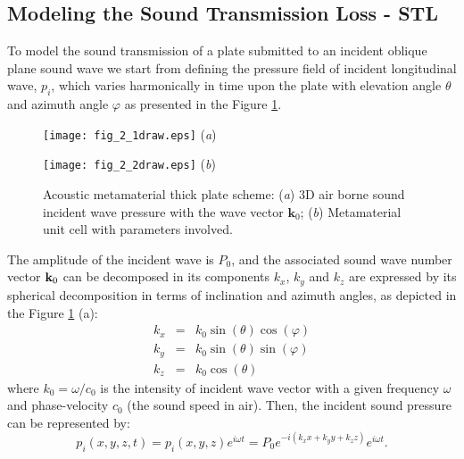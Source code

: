 \documentclass[a4paper]{ICEDyn}
\begin{document}
	\subsection{Modeling the Sound Transmission Loss - STL}

To model the sound transmission of a plate submitted to an incident oblique plane sound wave we start from defining the pressure field of incident longitudinal wave, $p_{i}$, which varies harmonically in time upon the plate with elevation angle $\theta$ and azimuth angle $\varphi$ as presented in the Figure \ref{incid}.
	\begin{figure}
		\begin{minipage} {.50\linewidth}
		\centering 
		\texttt{[image: fig\_2\_1draw.eps]}
		{(\textit{a})}%
		\end{minipage}\hfill
	\begin{minipage}{.50\linewidth}
		\centering
		\texttt{[image: fig\_2\_2draw.eps]}
		{(\textit{b})} %
	\end{minipage}\hfill
		\caption{Acoustic metamaterial thick plate scheme: (\textit{a}) 3D air borne sound incident wave pressure with the wave vector $ \mathbf{k}_{0} $; (\textit{b}) Metamaterial unit cell with parameters involved.}
		\label{incid}
	\end{figure}
	The amplitude of the incident wave is $P_0$, and the associated sound wave number vector ${\bf k}_0$ can be decomposed in its  components $k_{x}$, $k_{y}$ and $k_{z}$ are expressed by its spherical decomposition in terms of inclination and azimuth angles, as depicted in the Figure \ref{incid} (a):    
	\begin{eqnarray}
	k_{x} &=& k_{0}\sin(\theta)\cos(\varphi)\nonumber \\
	k_{y} &=& k_{0}\sin(\theta)\sin(\varphi) \nonumber\\ 
	k_{z} &=& k_{0}\cos(\theta) \nonumber
	\end{eqnarray}	
	where $k_{0} = \omega/c_{0}$ is the intensity of incident wave vector with a given frequency $\omega$ and phase-velocity $c_{0}$ (the sound speed in air). Then, the incident sound pressure can be represented by: 
	\begin{equation}\label{eq:13}
	p_{i}(x,y,z,t) =p_{i}(x,y,z)e^{i\omega t}= P_{0}e^{-i(k_{x}x + k_{y}y + k_{z}z)}e^{i\omega t}\label{pi} .
	\end{equation}
    
\end{document}
